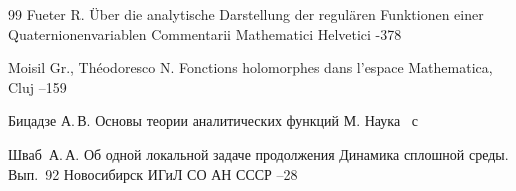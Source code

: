 \begin{thebibliography}{99}
\by  Fueter R.
\paper \"Uber die analytische Darstellung der regul\"aren Funktionen einer Quaternionenvariablen
\jour Commentarii Mathematici Helvetici
-378

\by  Moisil Gr., Th\'eodoresco N.
\paper Fonctions holomorphes dans l'espace
\jour Mathematica, Cluj
--159

\by Бицадзе А.\,В.
\book Основы теории аналитических функций 
\publaddr М.
\publ Наука
~с

\by  Шваб~А.\,А.
\paper Об одной локальной задаче продолжения 
\inbook Динамика сплошной среды. Вып.~{\rm 92}
\publaddr Новосибирск
\publ ИГиЛ СО АН СССР
--28

\end{thebibliography}



\makeengtitle




















%
%